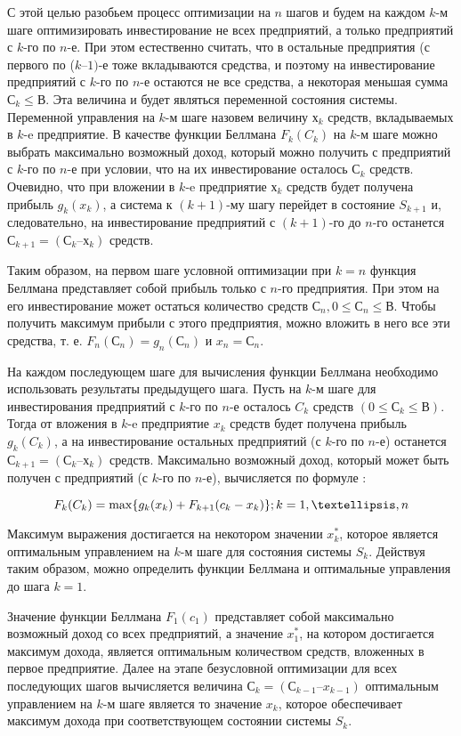 С этой целью разобьем процесс оптимизации на $n$ шагов и будем на каждом $k$-м шаге оптимизировать инвестирование не всех предприятий, а только предприятий с $k$-го по $n$-е. При этом естественно считать, что в остальные предприятия (с первого по ($k–1)$-е тоже вкладываются средства, и поэтому на инвестирование предприятий с $k$-го по $n$-е остаются не все средства, а некоторая меньшая сумма $С_k \leq В$. Эта величина и будет являться переменной состояния системы. Переменной управления на $k$-м шаге назовем величину $х_k$ средств, вкладываемых в $k$-e предприятие. В качестве функции Беллмана $F_k(C_k)$ на $k$-м шаге можно выбрать максимально возможный доход, который можно получить с предприятий с $k$-го по $n$-е при условии, что на их инвестирование осталось $С_k$ средств. Очевидно, что при вложении в $k$-e предприятие $х_k$ средств будет получена прибыль $g_k(x_k)$, а система к $(k+1)$-му шагу перейдет в состояние $S_{k+1}$ и, следовательно, на инвестирование предприятий с $(k+1)$-го до $n$-го останется $С_{k+1} = (С_k – х_k)$ средств.

Таким образом, на первом шаге условной оптимизации при $k = n$ функция Беллмана представляет собой прибыль только с $n$-го предприятия. При этом на его инвестирование может остаться количество средств $С_n, 0 \leq С_n \leq В$. Чтобы получить максимум прибыли с этого предприятия, можно вложить в него все эти средства, т. е. $F_n(С_n) = g_n(С_n)$ и $x_n = С_n$.

На каждом последующем шаге для вычисления функции Беллмана необходимо использовать результаты предыдущего шага. Пусть на $k$-м шаге для инвестирования предприятий с $k$-го по $n$-е осталось $C_k$ средств $(0 \leq С_k \leq В)$. Тогда от вложения в $k$-e предприятие $x_k$ средств будет получена прибыль $g_k(C_k)$, а на инвестирование остальных предприятий (с $k$-го по $n$-е) останется $С_{k+1} = (С_k – х_k)$ средств. Максимально возможный доход, который может быть получен с предприятий (с $k$-го по $n$-е), вычисляется по формуле \cite{formula:max:possible:income}:

\begin{equation}
\label{formula:max:possible:income}
F_k(C_k) = \max \{g_k(x_k) + F_{k+1}(c_k-x_k)\}; k = 1,\textellipsis,n
\end{equation}

Максимум выражения достигается на некотором значении $x^*_k$, которое является оптимальным управлением на $k$-м шаге для состояния системы $S_k$. Действуя таким образом, можно определить функции Беллмана и оптимальные управления до шага $k = 1$.

Значение функции Беллмана $F_1(c_1)$ представляет собой максимально возможный доход со всех предприятий, а значение $x^*_1$, на котором достигается максимум дохода, является оптимальным количеством средств, вложенных в первое предприятие. Далее на этапе безусловной оптимизации для всех последующих шагов вычисляется величина $С_k = (С_{k-1} – x_{k-1})$ оптимальным управлением на $k$-м шаге является то значение $x_k$, которое обеспечивает максимум дохода при соответствующем состоянии системы $S_k$.